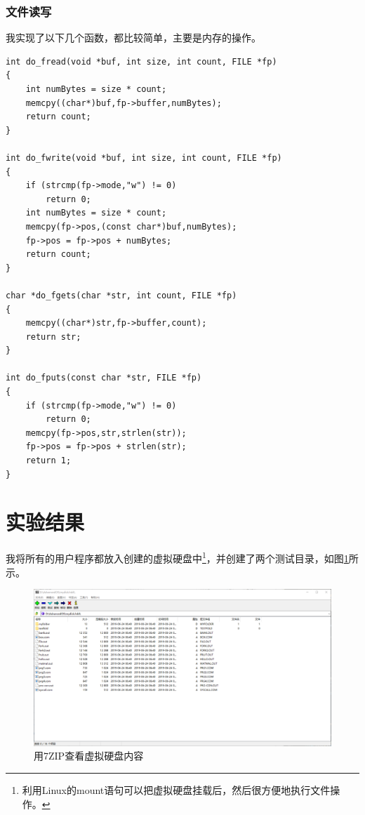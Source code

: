 \documentclass[logo,reportComp]{thesis}
\begin{document}
\subsubsection{文件读写}
我实现了以下几个函数，都比较简单，主要是内存的操作。
\begin{lstlisting}
int do_fread(void *buf, int size, int count, FILE *fp)
{
	int numBytes = size * count;
	memcpy((char*)buf,fp->buffer,numBytes);
	return count;
}

int do_fwrite(void *buf, int size, int count, FILE *fp)
{
	if (strcmp(fp->mode,"w") != 0)
		return 0;
	int numBytes = size * count;
	memcpy(fp->pos,(const char*)buf,numBytes);
	fp->pos = fp->pos + numBytes;
	return count;
}

char *do_fgets(char *str, int count, FILE *fp)
{
	memcpy((char*)str,fp->buffer,count);
	return str;
}

int do_fputs(const char *str, FILE *fp)
{
	if (strcmp(fp->mode,"w") != 0)
		return 0;
	memcpy(fp->pos,str,strlen(str));
	fp->pos = fp->pos + strlen(str);
	return 1;
}
\end{lstlisting}




\section{实验结果}
我将所有的用户程序都放入创建的虚拟硬盘中\footnote{利用Linux的mount语句可以把虚拟硬盘挂载后，然后很方便地执行文件操作。}，并创建了两个测试目录，如图\ref{fig:zip}所示。
\begin{figure}[H]
\centering
\includegraphics[width=0.8\linewidth]{fig/zip.png}
\caption{用7ZIP查看虚拟硬盘内容}
\label{fig:zip}
\end{figure}
\end{document}

